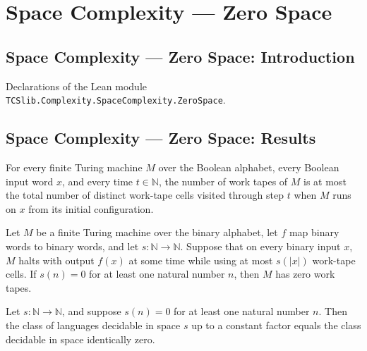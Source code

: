 \section{Space Complexity --- Zero Space}
\subsection*{Space Complexity --- Zero Space: Introduction}

Declarations of the Lean module \texttt{TCSlib.Complexity.SpaceComplexity.ZeroSpace}.

\subsection*{Space Complexity --- Zero Space: Results}

\begin{theorem}
\label{Turing.FinTM.k_le_spaceUsed}
\leanok
{}
For every finite Turing machine $M$ over the Boolean alphabet, every Boolean input word
$x$, and every time $t\in\mathbb N$, the number of work tapes of $M$ is at most the
total number of distinct work-tape cells visited through step $t$ when $M$ runs on $x$
from its initial configuration.
\end{theorem}

\begin{theorem}
\label{Turing.FinTM.ComputesInSpace.k_eq_zero_of_exists_zero}
\leanok
{}
Let $M$ be a finite Turing machine over the binary alphabet, let $f$ map binary words to
binary words, and let $s:\mathbb{N}\to\mathbb{N}$. Suppose that on every binary input
$x$, $M$ halts with output $f(x)$ at some time while using at most $s(|x|)$ work-tape
cells. If $s(n)=0$ for at least one natural number $n$, then $M$ has zero work tapes.
\end{theorem}

\begin{theorem}
\label{Complexity.SPACE_eq_zero_of_exists_zero}
\leanok
{}
Let $s:\mathbb{N}\to\mathbb{N}$, and suppose $s(n)=0$ for at least one natural number
$n$. Then the class of languages decidable in space $s$ up to a constant factor equals
the class decidable in space identically zero.
\end{theorem}

